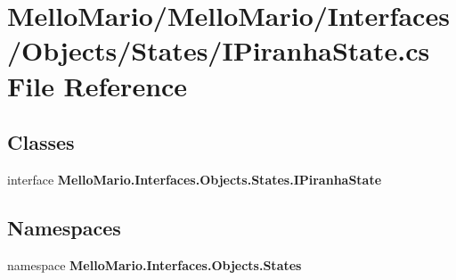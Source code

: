 \section{Mello\+Mario/\+Mello\+Mario/\+Interfaces/\+Objects/\+States/\+I\+Piranha\+State.cs File Reference}
\label{IPiranhaState_8cs}
\subsection*{Classes}
\begin{DoxyCompactItemize}
\item 
interface \textbf{ Mello\+Mario.\+Interfaces.\+Objects.\+States.\+I\+Piranha\+State}
\end{DoxyCompactItemize}
\subsection*{Namespaces}
\begin{DoxyCompactItemize}
\item 
namespace \textbf{ Mello\+Mario.\+Interfaces.\+Objects.\+States}
\end{DoxyCompactItemize}
